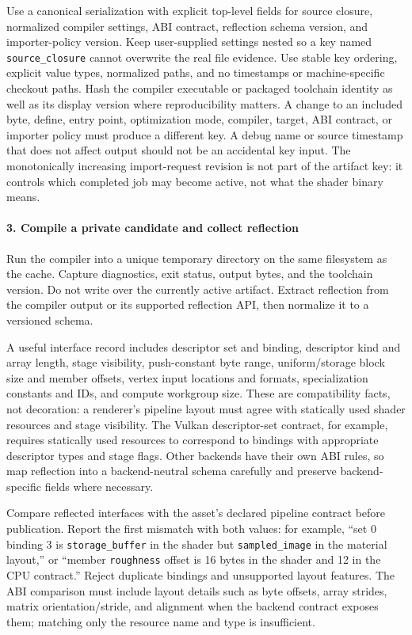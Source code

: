 Use a canonical serialization with explicit top-level fields for source closure, normalized compiler settings, ABI contract, reflection schema version, and importer-policy version. Keep user-supplied settings nested so a key named \texttt{source\_closure} cannot overwrite the real file evidence. Use stable key ordering, explicit value types, normalized paths, and no timestamps or machine-specific checkout paths. Hash the compiler executable or packaged toolchain identity as well as its display version where reproducibility matters. A change to an included byte, define, entry point, optimization mode, compiler, target, ABI contract, or importer policy must produce a different key. A debug name or source timestamp that does not affect output should not be an accidental key input. The monotonically increasing import-request revision is not part of the artifact key: it controls which completed job may become active, not what the shader binary means.

\paragraph{3. Compile a private candidate and collect reflection}\label{compile-a-private-candidate-and-collect-reflection}

Run the compiler into a unique temporary directory on the same filesystem as the cache. Capture diagnostics, exit status, output bytes, and the toolchain version. Do not write over the currently active artifact. Extract reflection from the compiler output or its supported reflection API, then normalize it to a versioned schema.

A useful interface record includes descriptor set and binding, descriptor kind and array length, stage visibility, push-constant byte range, uniform/storage block size and member offsets, vertex input locations and formats, specialization constants and IDs, and compute workgroup size. These are compatibility facts, not decoration: a renderer's pipeline layout must agree with statically used shader resources and stage visibility. The Vulkan descriptor-set contract, for example, requires statically used resources to correspond to bindings with appropriate descriptor types and stage flags. Other backends have their own ABI rules, so map reflection into a backend-neutral schema carefully and preserve backend-specific fields where necessary.

Compare reflected interfaces with the asset's declared pipeline contract before publication. Report the first mismatch with both values: for example, ``set 0 binding 3 is \texttt{storage\_buffer} in the shader but \texttt{sampled\_image} in the material layout,'' or ``member \texttt{roughness} offset is 16 bytes in the shader and 12 in the CPU contract.'' Reject duplicate bindings and unsupported layout features. The ABI comparison must include layout details such as byte offsets, array strides, matrix orientation/stride, and alignment when the backend contract exposes them; matching only the resource name and type is insufficient.

